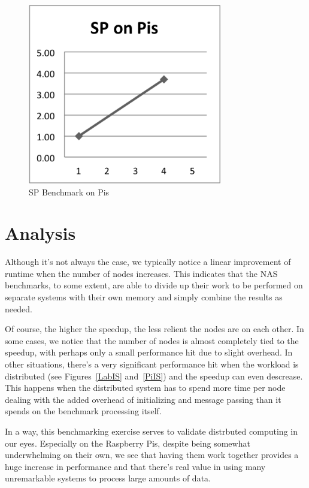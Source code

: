 \documentclass{acm_proc_article-sp}
\begin{document}
\begin{figure}[tbp]
  \centering
  \caption{SP Benchmark on Pis}
	\label{PiSP}
  \includegraphics[width=20pc]{Pics-Pi/SP.png}
\end{figure}

\section{Analysis}
Although it's not always the case, we typically notice a linear improvement of runtime when the number of nodes increases. This indicates that the NAS benchmarks, to some extent, are able to divide up their work to be performed on separate systems with their own memory and simply combine the results as needed.

Of course, the higher the speedup, the less relient the nodes are on each other. In some cases, we notice that the number of nodes is almost completely tied to the speedup, with perhaps only a small performance hit due to slight overhead. In other situations, there's a very significant performance hit when the workload is distributed (see Figures~\ref{LabIS} and~\ref{PiIS}) and the speedup can even descrease. This happens when the distributed system has to spend more time per node dealing with the added overhead of initializing and message passing than it spends on the benchmark processing itself.

In a way, this benchmarking exercise serves to validate distrbuted computing in our eyes. Especially on the Raspberry Pis, despite being somewhat underwhelming on their own, we see that having them work together provides a huge increase in performance and that there's real value in using many unremarkable systems to process large amounts of data.


%

\end{document}
